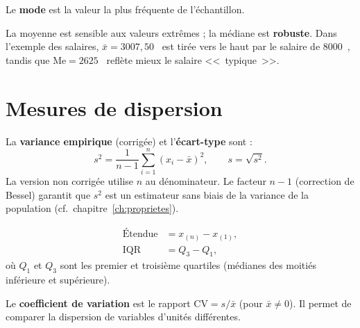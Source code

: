 \begin{definition}[Mode]
Le \textbf{mode} est la valeur la plus fr\'equente de l'\'echantillon.
\end{definition}

\begin{intuition}
La moyenne est sensible aux valeurs extr\^emes ; la m\'ediane est \textbf{robuste}. Dans l'exemple des salaires, $\bar{x}=3007{,}50$~\texteuro{} est tir\'ee vers le haut par le salaire de 8000~\texteuro{}, tandis que $\mathrm{Me}=2625$~\texteuro{} refl\`ete mieux le salaire <<~typique~>>.
\end{intuition}

\section{Mesures de dispersion}

\begin{definition}
La \textbf{variance empirique} (corrig\'ee) et l'\textbf{\'ecart-type} sont :
\[
s^2 = \frac{1}{n-1}\sum_{i=1}^{n}(x_i-\bar{x})^2, \qquad s = \sqrt{s^2}.
\]
La version non corrig\'ee utilise $n$ au d\'enominateur. Le facteur $n-1$ (correction de Bessel) garantit que $s^2$ est un estimateur sans biais de la variance de la population (cf.\ chapitre~\ref{ch:proprietes}).
\end{definition}

\begin{definition}
\begin{align}
\text{\'Etendue} &= x_{(n)} - x_{(1)}, \\
\text{IQR} &= Q_3 - Q_1,
\end{align}
o\`u $Q_1$ et $Q_3$ sont les premier et troisi\`eme quartiles (m\'edianes des moiti\'es inf\'erieure et sup\'erieure).
\end{definition}

\begin{definition}
Le \textbf{coefficient de variation} est le rapport $\mathrm{CV} = s/\bar{x}$ (pour $\bar{x}\neq 0$). Il permet de comparer la dispersion de variables d'unit\'es diff\'erentes.
\end{definition}

